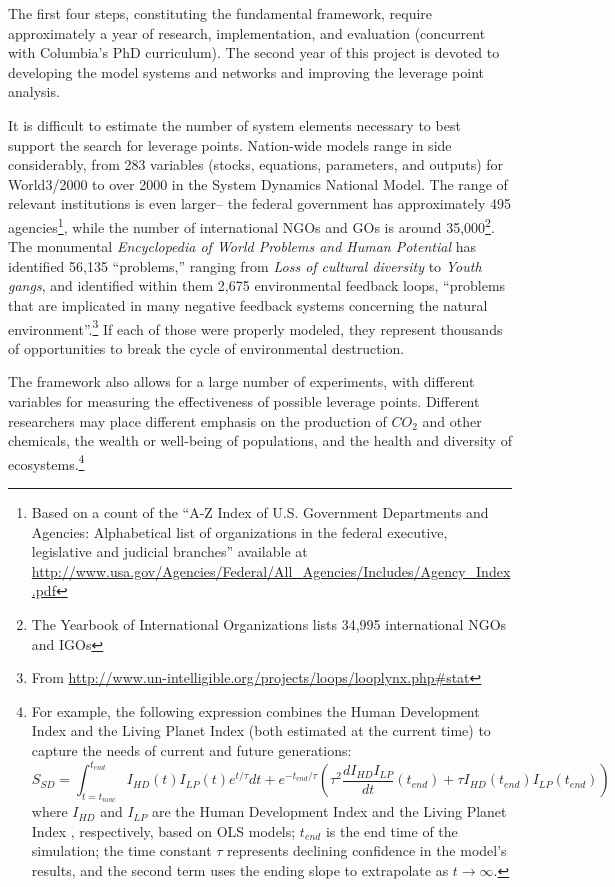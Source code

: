 \documentclass[12pt, oneside]{amsart}
\begin{document}
The first four steps, constituting the fundamental framework, require approximately a year of research, implementation, and evaluation (concurrent with Columbia's PhD curriculum).  The second year of this project is devoted to developing the model systems and networks and improving the leverage point analysis.

It is difficult to estimate the number of system elements necessary to best support the search for leverage points.  Nation-wide models range in side considerably, from 283 variables (stocks, equations, parameters, and outputs) for World3/2000 to over 2000 in the System Dynamics National Model.  The range of relevant institutions is even larger-- the federal government has approximately 495 agencies\footnote{Based on a count of the ``A-Z Index of U.S. Government Departments and Agencies: Alphabetical list of organizations in the federal executive, legislative and judicial branches'' available at \url{http://www.usa.gov/Agencies/Federal/All_Agencies/Includes/Agency_Index.pdf}}, while the number of international NGOs and GOs is around 35,000\footnote{The Yearbook of International Organizations lists 34,995 international NGOs and IGOs}.  The monumental \emph{Encyclopedia of World Problems and Human Potential} has identified 56,135 ``problems,'' ranging from \emph{Loss of cultural diversity} to \emph{Youth gangs}, and identified within them 2,675 environmental feedback loops, ``problems that are implicated in many negative feedback systems concerning the natural environment''.\footnote{From \url{http://www.un-intelligible.org/projects/loops/looplynx.php\#stat}}  If each of those were properly modeled, they represent thousands of opportunities to break the cycle of environmental destruction.

The framework also allows for a large number of experiments, with different variables for measuring the effectiveness of possible leverage points.  Different researchers may place different emphasis on the production of $CO_2$ and other chemicals, the wealth or well-being of populations, and the health and diversity of ecosystems.\footnote{For example, the following expression combines the Human Development Index and the Living Planet Index (both estimated at the current time) to capture the needs of current and future generations:
\[
S_{SD} = \int_{t=t_{now}}^{t_{end}} I_{HD}(t) I_{LP}(t) e^{t/\tau} dt + e^{-t_{end}/\tau} \left(\tau^2 \frac{d I_{HD} I_{LP}}{dt}(t_{end}) + \tau I_{HD}(t_{end}) I_{LP}(t_{end})\right)
\]
where $I_{HD}$ and $I_{LP}$ are the Human Development Index and the Living Planet Index \citep{loh2005living}, respectively, based on OLS models; $t_{end}$ is the end time of the simulation; the time constant $\tau$ represents declining confidence in the model's results, and the second term uses the ending slope to extrapolate as $t \to \infty$.}
\end{document}
